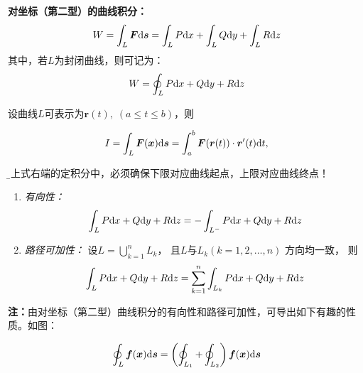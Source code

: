 \begin{thx}
	{\bf 对坐标（第二型）的曲线积分：}
	$${W=\displaystyle\int_L\bm{F}\mathrm{d}\bm{s}=\displaystyle\int_LP\mathrm{d} x+\displaystyle\int_LQ\mathrm{d} y+\displaystyle\int_LR\mathrm{d} z}$$
	其中，若$L$为封闭曲线，则可记为：
	$$W=\oint_LP\mathrm{d} x+Q\mathrm{d} y+R\mathrm{d} z$$
\end{thx}

设曲线$L$可表示为$\bm{r}(t),\;(a\leq t\leq b)$，则
\begin{thx}
	$$I=\displaystyle\int_L\bm{F}(\bm{x})\mathrm{d}\bm{s}
	=\displaystyle\int_a^b\bm{F}(\bm{r}(t))\cdot\bm{r}'(t)\mathrm{d} t,$$
\end{thx}
{\b 在上式右端的定积分中，必须确保下限对应曲线起点，上限对应曲线终点！}
\begin{enumerate}[(1)]
  \setlength{\itemindent}{1cm}
  \item {\it 有向性：}
  $$\displaystyle\int_LP\mathrm{d} x+Q\mathrm{d} y+R\mathrm{d} z=-\displaystyle\int_{L^-}P\mathrm{d} x+Q\mathrm{d} y+R\mathrm{d} z$$
  \item {\it 路径可加性：} 设$L=\bigcup_{k=1}^nL_k$， 且$L$与$L_k(k=1,2,\ldots,n)$
  方向均一致， 则
  $$\displaystyle\int_LP\mathrm{d} x+Q\mathrm{d} y+R\mathrm{d} z=\sum\limits_{k=1}^n\displaystyle\int_{L_k}P\mathrm{d} x+Q\mathrm{d} y+R\mathrm{d} z$$
\end{enumerate}

{\bf 注：}由对坐标（第二型）曲线积分的有向性和路径可加性，可导出如下有趣的性质。如图：
\begin{center}
\end{center}
$$\oint_{L}\bm{f}(\bm{x})\mathrm{d}\bm{s}
=\left(\oint_{L_1}+\oint_{L_2}\right)\bm{f}(\bm{x})\mathrm{d}\bm{s}$$

